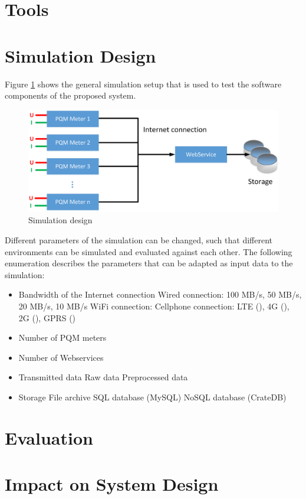 \section{Tools}

\section{Simulation Design}

Figure \ref{fig:simulation_design} shows the general simulation setup that is used to test the software components of the proposed system.

\begin{figure}[h]
	\centering
		\includegraphics[scale=0.4]{graphics/simulation.eps}
	\caption{Simulation design}
	\label{fig:simulation_design}
\end{figure}

Different parameters of the simulation can be changed, such that different environments can be simulated and evaluated against each other. The following enumeration describes the parameters that can be adapted as input data to the simulation:

\begin{itemize}
	\item Bandwidth of the Internet connection
		\subitem Wired connection: 100 MB/s, 50 MB/s, 20 MB/s, 10 MB/s
		\subitem WiFi connection: 
		\subitem Cellphone connection: LTE (), 4G (), 2G (), GPRS ()
	\item Number of PQM meters
	\item Number of Webservices
	\item Transmitted data
		\subitem Raw data
		\subitem Preprocessed data
  \item Storage
		\subitem File archive
		\subitem SQL database (MySQL)
		\subitem NoSQL database (CrateDB)
\end{itemize}

\section{Evaluation}

\section{Impact on System Design}